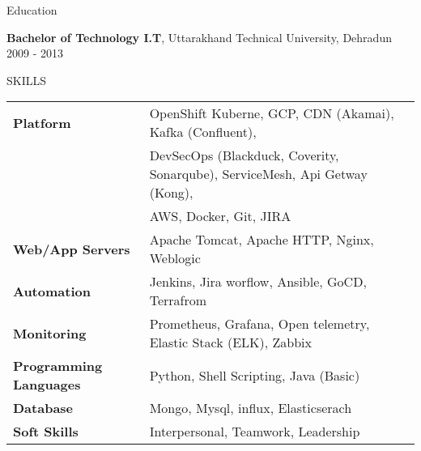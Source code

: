 \documentclass{resume} %
\begin{document}





\begin{rSection}{Education}


{\bf Bachelor of Technology I.T}, Uttarakhand Technical University, Dehradun \hfill {2009 - 2013}


\end{rSection}

\begin{rSection}{SKILLS}

\begin{tabular}{ @{} >{\bfseries}l @{\hspace{4ex}} l }
Platform  & OpenShift Kuberne, GCP, CDN (Akamai), Kafka (Confluent),\\ &  DevSecOps (Blackduck, Coverity, Sonarqube), ServiceMesh, Api Getway (Kong),\\ & AWS, Docker, Git, JIRA\\
Web/App Servers & Apache Tomcat, Apache HTTP, Nginx, Weblogic\\
Automation & Jenkins, Jira worflow, Ansible, GoCD, Terrafrom\\
Monitoring & Prometheus, Grafana, Open telemetry, Elastic Stack (ELK), Zabbix\\
Programming Languages &  Python, Shell Scripting, Java (Basic)\\
Database &  Mongo, Mysql, influx, Elasticserach\\
Soft Skills & Interpersonal, Teamwork, Leadership\\
\end{tabular}\\
\end{rSection}
\end{document}

